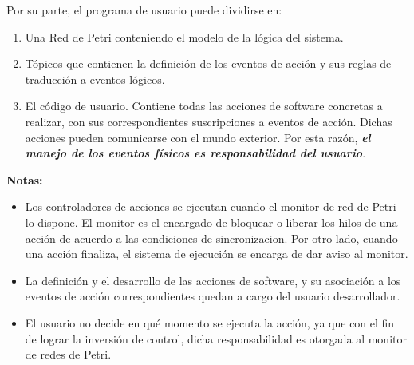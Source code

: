 Por su parte, el programa de usuario puede dividirse en:
\begin{enumerate}
  \item Una Red de Petri conteniendo el modelo de la lógica del sistema.
  \item Tópicos que contienen la definición de los eventos de acción y sus
  reglas de traducción a eventos lógicos.
  \item El código de usuario. Contiene todas las acciones de software
	concretas a realizar, con sus correspondientes suscripciones a eventos
	de acción. Dichas acciones pueden comunicarse con el mundo exterior. Por esta
	razón, \textbf{\emph{el manejo de los eventos físicos es responsabilidad del
	usuario}}.
\end{enumerate}

\begin{framed}
\textbf{Notas:} 
\begin{itemize}
\item Los controladores de acciones se ejecutan cuando el monitor de red de
Petri lo dispone. El monitor es el encargado de bloquear o liberar los hilos de una
acción de acuerdo a las condiciones de sincronizacion. Por otro lado, cuando una
acción finaliza, el sistema de ejecución se encarga de dar aviso al monitor.

\item La definición y el desarrollo de las acciones de software, y su
asociación a los eventos de acción correspondientes quedan a cargo del usuario
desarrollador. 

\item El usuario no decide en qué momento se ejecuta la acción, ya que
con el fin de lograr la inversión de control, dicha responsabilidad es otorgada
al monitor de redes de Petri.
\end{itemize}
\end{framed}